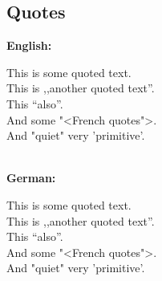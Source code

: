\documentclass[11pt]{article}
\begin{document}
		\subsection{Quotes}
			\textbf{English:}\\
			\begin{otherlanguage}{english}
				This is \glqq some quoted text\grqq. \\
				This is ,,another quoted text''. \\
				This "`also"'. \\
				And some "<French quotes">. \\
				And "quiet" very 'primitive'.
			\end{otherlanguage}

			\mbox{}\\
			\textbf{German:}\\
			\begin{otherlanguage}{ngerman}
				This is \glqq some quoted text\grqq. \\
				This is ,,another quoted text''. \\
				This "`also"'. \\
				And some "<French quotes">. \\
				And "quiet" very 'primitive'.
			\end{otherlanguage}
\end{document}

